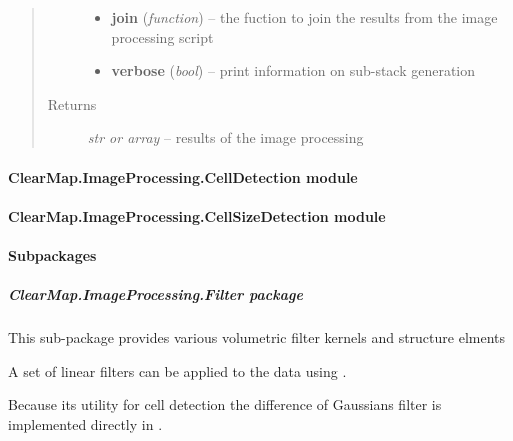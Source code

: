 \documentclass[letterpaper,10pt,english]{sphinxmanual}
\begin{document}
\begin{fulllineitems}
\begin{quote}
\begin{description}
\begin{itemize}
\item {} 
\textbf{join} (\emph{function}) --
the fuction to join the results from the image processing script

\item {} 
\textbf{verbose} (\emph{bool}) --
print information on sub-stack generation

\end{itemize}

\item[{Returns}] \leavevmode
\emph{str or array} --
results of the image processing

\end{description}\end{quote}

\end{fulllineitems}



\paragraph{ClearMap.ImageProcessing.CellDetection module}
\label{api/ClearMap.ImageProcessing:clearmap-imageprocessing-celldetection-module}

\paragraph{ClearMap.ImageProcessing.CellSizeDetection module}
\label{api/ClearMap.ImageProcessing:clearmap-imageprocessing-cellsizedetection-module}

\paragraph{Subpackages}
\label{api/ClearMap.ImageProcessing:subpackages}

\subparagraph{ClearMap.ImageProcessing.Filter package}
\label{api/ClearMap.ImageProcessing.Filter:module-ClearMap.ImageProcessing.Filter}\label{api/ClearMap.ImageProcessing.Filter::doc}\label{api/ClearMap.ImageProcessing.Filter:clearmap-imageprocessing-filter-package}
This sub-package provides various volumetric filter kernels and structure elments

A set of linear filters can be applied to the data using
{\hyperref[api/ClearMap.ImageProcessing.Filter:module-ClearMap.ImageProcessing.Filter.LinearFilter]{\emph{}}}.

Because its utility for cell detection the difference of Gaussians filter
is implemented directly in {\hyperref[api/ClearMap.ImageProcessing.Filter:module-ClearMap.ImageProcessing.Filter.DoGFilter]{\emph{}}}.
\end{document}
